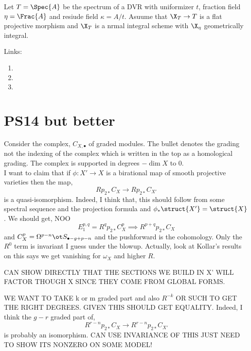 \documentclass[12pt]{article}
\begin{document}
Let $T = \Spec{A}$ be the spectrum of a DVR with uniformizer $t$, fraction field $\eta = \Frac{A}$ and resiude field $\kappa = A / t$. Asuume that $\X_T \to T$ is a flat projective morphism and $\X_T$ is a nrmal integral scheme with $\X_\eta$ geometrically integral. 

\begin{prop}

\end{prop}

Links:

\begin{enumerate}
\item {}

\item {}

\item {}
\end{enumerate}

\section{PS14 but better}

Consider the complex, $C_{X, \bullet}$ of graded modules. The bullet denotes the grading not the indexing of the complex which is written in the top as a homological grading. The complex is supported in degrees $-\dim{X}$ to $0$.
\bigskip\\
I want to claim that if $\phi : X' \to X$ is a birational map of smooth projective varieties then the map,
\[ R p_{2 *} C_{X} \to R p_{2 *} C_{X'} \]
is a quasi-isomorphism. Indeed, I think that, this should follow from some spectral sequence and the projection formula and $\phi_* \struct{X'} = \struct{X}$. We should get, NOO
\[ E_1^{p,q} = R^q p_{2 *} C_X^p \implies R^{p+q} p_{2 *} C_X \]
and $C_X^p = \Omega^{p-n} \ot S_{\bullet - g + p - n}$ and the pushforward is the cohomology. Only the $R^0$ term is invariant I guess under the blowup. Actually, look at Kollar's results on this says we get vanishing for $\omega_X$ and higher $R$.

CAN SHOW DIRECTLY THAT THE SECTIONS WE BUILD IN X' WILL FACTOR THOUGH X SINCE THEY COME FROM GLOBAL FORMS.

WE WANT TO TAKE k or m graded part and also $R^{-k}$ OR SUCH TO GET THE RIGHT DEGREES. GIVEN THIS SHOULD GET EQUALITY. Indeed, I think the $g - r$ graded part of,
\[ R^{r-n} p_{2*} C_{X} \to R^{r-n} p_{2*} C_{X'} \]
is probably an isomorphism. CAN USE INVARIANCE OF THIS JUST NEED TO SHOW ITS NONZERO ON SOME MODEL!
\end{document}
